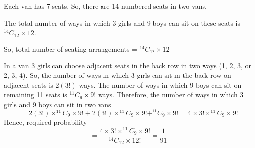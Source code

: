 \documentclass{article}
\begin{document}
Each van has 7 seats. So, there are 14 numbered seats in two vans. \hfill \break

The total number of ways in which 3 girls and 9 boys can sit on these seats is 
\(^{14}C_{12} \times 12 \). \hfill \break

So, total number of seating arrangements = \(^{14}C_{12} \times 12 \) \hfill \break

In a van 3 girls can choose adjacent seats in the back row in two ways 
(1, 2, 3, or 2, 3, 4). So, the number of ways in which 3 girls can sit in the back row
on adjacent seats is \(2 (3!)\) ways. The number of ways in which 9 boys can sit 
on remaining 11 seats is \(^{11}C_{9} \times 9! \) ways. Therefore, the number
of ways in which 3 girls and 9 boys can sit in two vans
\[ = 2(3!) \times ^{11}C_{9} \times 9! + 2(3!) \times ^{11}C_{9} \times 9! + ^{11}C_{9} \times 9!
= 4 \times 3! \times ^{11}C_{9} \times 9!
\]
Hence, required probability \[=\frac{4 \times 3! \times ^{11}C_{9} \times 9!}{^{14}C_{12} \times 12!}
= \frac{1}{91} \]
 
\end{document}
